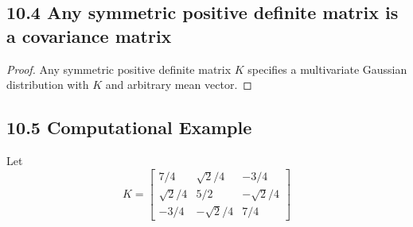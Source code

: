 \documentclass[../main.tex]{subfiles}
\begin{document}
\subsection*{10.4 Any symmetric positive definite matrix is a covariance matrix}
\begin{proof}
    Any symmetric positive definite matrix $K$ specifies a multivariate Gaussian distribution with $K$ and arbitrary mean vector.
\end{proof}
\subsection*{10.5 Computational Example}
Let \[
K=\begin{bmatrix}
    7/4 & \sqrt{2}/4 & -3/4\\
    \sqrt{2}/4 & 5/2 & -\sqrt{2}/4 \\
    -3/4 & -\sqrt{2}/4 & 7/4
\end{bmatrix}
\]
\end{document}
